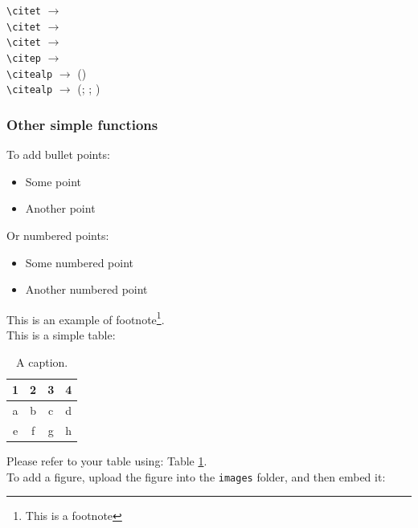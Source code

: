 \documentclass{article}
\begin{document}
\noindent
\verb|\citet| $\rightarrow$ \citet{jenset&mcgil}\\
\verb|\citet| $\rightarrow$ \citet{australiashealth}\\
\verb|\citet| $\rightarrow$ \citet{shree-a}\\
\verb|\citep| $\rightarrow$ \citep{fabricius-hansen2012b}\\
\verb|\citealp| $\rightarrow$ (\citealp{eckhoff2018a})\\
\verb|\citealp| $\rightarrow$ (\citealp{eckhoff2018a}; \citealp{fabricius-hansen2012b}; \citealp{shree-a})\\

\subsubsection{Other simple functions}
To add bullet points:

\begin{itemize}
    \item Some point
    \item Another point
\end{itemize}

\noindent Or numbered points:

\begin{itemize}
    \item[1.] Some numbered point
    \item[2.] Another numbered point
\end{itemize}

\noindent This is an example of footnote\footnote{This is a footnote}. \\

\noindent This is a simple table:

\begin{table}[H]
\centering %
\caption{\label{tab1} A caption.}
\begin{tabular}{cccc}
\hline
1 & 2 & 3 & 4 \\
\hline
a & b & c & d\\
e & f & g & h\\
\hline
\end{tabular}
\end{table}

\noindent Please refer to your table using: Table \ref{tab1}.\\

\noindent To add a figure, upload the figure into the \texttt{images} folder, and then embed it:
\end{document}
